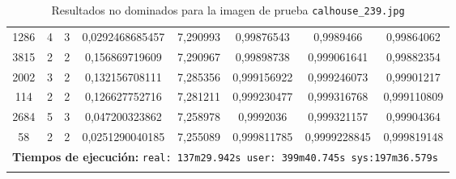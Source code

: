 \begin{longtable}{|c|c|c|c|c|c|c|c|}
1286 & 4 & 3 & 0,0292468685457 & 7,290993 & 0,99876543 & 0,9989466 & 0,99864062 \\
3815 & 2 & 2 & 0,156869719609 & 7,290967 & 0,99898738 & 0,999061641 & 0,99882354 \\
2002 & 3 & 2 & 0,132156708111 & 7,285356 & 0,999156922 & 0,999246073 & 0,99901217 \\
114 & 2 & 2 & 0,126627752716 & 7,281211 & 0,999230477 & 0,999316768 & 0,999110809 \\
2684 & 5 & 3 & 0,047200323862 & 7,258978 & 0,9992036 & 0,999321157 & 0,99904364 \\
58 & 2 & 2 & 0,0251290040185 & 7,255089 & 0,999811785 & 0,9999228845 & 0,999819148 \\
\multicolumn{8}{|c|}{\textbf{Tiempos de ejecución:} \texttt{real: 137m29.942s user: 399m40.745s sys:197m36.579s
}}\\ \hline
\caption{Resultados no dominados para la imagen de prueba \texttt{calhouse\_239.jpg}}
\label{tab:calhouse_239}
\end{longtable}
\normalsize

